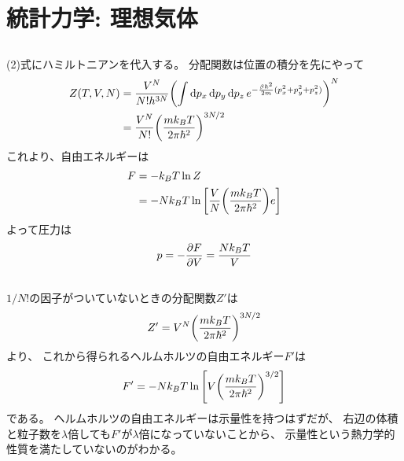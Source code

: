 \documentclass[../../sp_2019.tex]{subfiles}
\begin{document}
\setcounter{section}{0}
\section{統計力学: 理想気体}
\subsection{}
(2)式にハミルトニアンを代入する。
分配関数は位置の積分を先にやって
\begin{equation}\begin{aligned}[b]
    Z(T,V,N)
    &= \frac{V^N}{N!h^{3N}}\qty(\int\dd{p_x}\dd{p_y}\dd{p_z}e^{-\frac{\beta\hbar^2}{2m}(p_x^2+p_y^2+p_z^2)})^N\\
    &= \frac{V^N}{N!}\qty(\frac{mk_BT}{2\pi\hbar^2})^{3N/2}
\end{aligned}\end{equation}
これより、自由エネルギーは
\begin{equation}\begin{aligned}[b]
    F &= -k_BT \ln Z \\
    &= -Nk_BT\ln\qty[\frac{V}{N}\qty(\frac{mk_BT}{2\pi\hbar^2})e]
\end{aligned}\end{equation}
よって圧力は
\begin{equation}\begin{aligned}[b]
    p = -\pdv{F}{V} = \frac{Nk_BT}{V}
\end{aligned}\end{equation}

\subsection{}
\(1/N!\)の因子がついていないときの分配関数\(Z'\)は
\begin{equation}\begin{aligned}[b]
    Z' = V^N \qty(\frac{mk_BT}{2\pi\hbar^2})^{3N/2}
\end{aligned}\end{equation}
より、
これから得られるヘルムホルツの自由エネルギー\(F'\)は
\begin{equation}\begin{aligned}[b]
    F' = -Nk_BT\ln\qty[V\qty(\frac{mk_BT}{2\pi\hbar^2})^{3/2}]
\end{aligned}\end{equation}
である。
ヘルムホルツの自由エネルギーは示量性を持つはずだが、
右辺の体積と粒子数を\(\lambda\)倍しても\(F'\)が\(\lambda\)倍になっていないことから、
示量性という熱力学的性質を満たしていないのがわかる。
\end{document}
